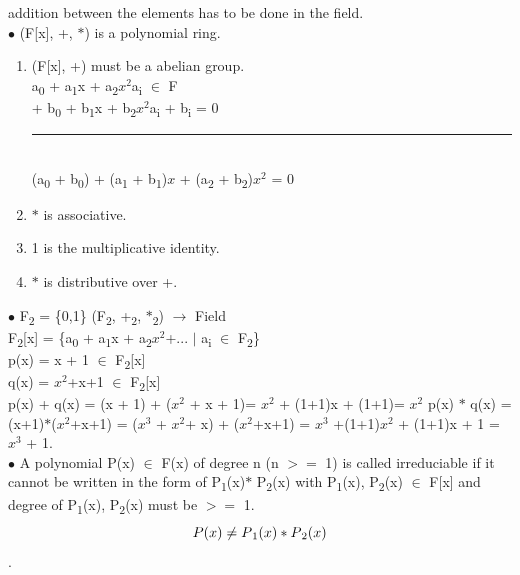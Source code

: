 \documentclass[11pt]{article}
\newcommand*{\xdash}[1][3em]{\rule[0.5ex]{#1}{0.55pt}}
\begin{document}
	addition between the elements has to be done in the field.\\
	$\bullet$ (F[x], +, $\ast$) is a polynomial ring.\\
	\begin{enumerate}
		\item (F[x], +) must be a abelian group.\\
		\hspace*{0.4cm}a\textsubscript{0} + a\textsubscript{1}x + a\textsubscript{2}$x^2$\hfill a\textsubscript{i} $\in$ F\\
		+ b\textsubscript{0} + b\textsubscript{1}x + b\textsubscript{2}$x^2$\hfill a\textsubscript{i} + b\textsubscript{i} = 0\\\hspace*{0.2cm} \xdash[7.8em]\\
		\hspace*{0.4cm}(a\textsubscript{0} + b\textsubscript{0}) + (a\textsubscript{1} + b\textsubscript{1})$x$ + (a\textsubscript{2} + b\textsubscript{2})$x^2$ = 0
		\item $\ast$ is associative.
		\item 1 is the multiplicative identity.
		\item $\ast$ is distributive over +.
	\end{enumerate}
	$\bullet$ F\textsubscript{2} = \{0,1\} \hfill (F\textsubscript{2}, +\textsubscript{2}, $\ast$\textsubscript{2}) $\rightarrow$ Field\\
	F\textsubscript{2}[x] = \{a\textsubscript{0} + a\textsubscript{1}x + a\textsubscript{2}$x^2$+...
	$|$ a\textsubscript{i} $\in$ F\textsubscript{2}\}\\
	p(x) = x + 1     $\in$ F\textsubscript{2}[x]\\
	q(x) = $x^2$+x+1    $\in$ F\textsubscript{2}[x]\\
	p(x) + q(x) =  (x + 1) + ($x^2$ + x + 1)= $x^2$ + (1+1)x + (1+1)= $x^2$
	p(x) $\ast$ q(x) = (x+1)$\ast$($x^2$+x+1) = ($x^3$ + $x^2$+ x) + ($x^2$+x+1) = $x^3$ +(1+1)$x^2$ + (1+1)x + 1 = $x^3$ + 1.\vspace{0.3cm}\\
	$\bullet$ A polynomial P(x) $\in$ F(x) of degree n (n $>=$ 1) is called irreduciable if it cannot be written in the form of 
	P\textsubscript{1}(x)$\ast$ P\textsubscript{2}(x) with P\textsubscript{1}(x), P\textsubscript{2}(x) $\in$ F[x]
	and degree of P\textsubscript{1}(x), P\textsubscript{2}(x) must be $>=$ 1.\\
	$$P(x) \neq P\textsubscript{1}(x)\ast P\textsubscript{2}(x)$$.\\
\end{document}
